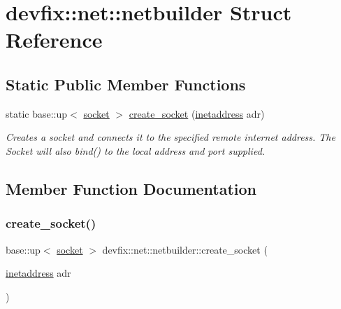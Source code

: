 \hypertarget{structdevfix_1_1net_1_1netbuilder}{}\section{devfix\+:\+:net\+:\+:netbuilder Struct Reference}
\label{structdevfix_1_1net_1_1netbuilder}
\subsection*{Static Public Member Functions}
\begin{DoxyCompactItemize}
\item 
static base\+::up$<$ \hyperlink{structdevfix_1_1net_1_1socket}{socket} $>$ \hyperlink{structdevfix_1_1net_1_1netbuilder_a089c1c1eaca97e09a483cc0f22793b97}{create\+\_\+socket} (\hyperlink{structdevfix_1_1net_1_1inetaddress}{inetaddress} adr)
\begin{DoxyCompactList}\small\item\em Creates a socket and connects it to the specified remote internet address. The Socket will also bind() to the local address and port supplied. \end{DoxyCompactList}\end{DoxyCompactItemize}


\subsection{Member Function Documentation}
\mbox{\label{structdevfix_1_1net_1_1netbuilder_a089c1c1eaca97e09a483cc0f22793b97}} 
\subsubsection{\texorpdfstring{create\+\_\+socket()}{create\_socket()}}
{\footnotesize\ttfamily base\+::up$<$ \hyperlink{structdevfix_1_1net_1_1socket}{socket} $>$ devfix\+::net\+::netbuilder\+::create\+\_\+socket (\begin{DoxyParamCaption}\item[{\hyperlink{structdevfix_1_1net_1_1inetaddress}{inetaddress}}]{adr }\end{DoxyParamCaption})\hspace{0.3cm}{\ttfamily [static]}}



